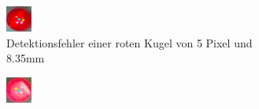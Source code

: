 \begin{figure}[h!]
    \centering
    \begin{subfigure}[t]{0.3\textwidth}
        \centering
        \includegraphics[width=1.0\linewidth]{../common/04_results/resources/bad_detection_4_8.356600_5.099020.png}
        \caption{Detektionsfehler einer roten Kugel von 5 Pixel und 8.35mm}
        \label{fig:detection_results_bad_detection_1}
    \end{subfigure}
    \begin{subfigure}[t]{0.3\textwidth}
        \centering
        \includegraphics[width=1.0\linewidth]{../common/04_results/resources/bad_detection_5_7.727108_4.472136.png}

\end{subfigure}
\end{figure}
